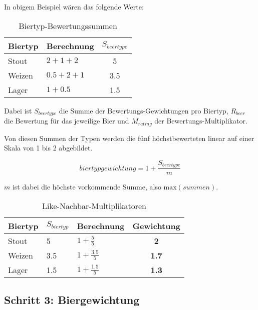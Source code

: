\documentclass[10pt,a4paper]{scrartcl}
\begin{document}
In obigem Beispiel wären das folgende Werte:

\begin{table}[h!]
	\begin{center}
		\begin{tabular}{llc}
			\toprule
			Biertyp & Berechnung & $S_{beertype}$ \\
			\midrule
			Stout  & $2 + 1 + 2$   & 5 \\
			Weizen & $0.5 + 2 + 1$ & 3.5 \\
			Lager  & $1 + 0.5$     & 1.5 \\
			\bottomrule
		\end{tabular}
	\end{center}
	\caption{Biertyp-Bewertungssummen}
	\label{table:biertyp-bewertungs-summen}
\end{table}

Dabei ist $S_{beertype}$ die Summe der Bewertungs-Gewichtungen pro Biertyp, $R_{beer}$ die Bewertung
für das jeweilige Bier und $M_{rating}$ der Bewertungs-Multiplikator.

Von diesen Summen der Typen werden die fünf höchstbewerteten linear auf einer Skala von 1 bis 2
abgebildet.

$$biertypgewichtung = 1 + \frac{S_{beertype}}{m}$$

$m$ ist dabei die höchste vorkommende Summe, also $\textrm{max}(summen)$.

\begin{table}[h!]
	\begin{center}
		\begin{tabular}{lllc}
			\toprule
			Biertyp & $S_{biertyp}$ & Berechnung & Gewichtung \\
			\midrule
			Stout  & 5   & $1 + \frac{5}{5}$   & \textbf{2} \\
			Weizen & 3.5 & $1 + \frac{3.5}{5}$ & \textbf{1.7}   \\
			Lager  & 1.5 & $1 + \frac{1.5}{5}$ & \textbf{1.3} \\
			\bottomrule
		\end{tabular}
	\end{center}
	\label{like-nachbar-multiplikatoren}
	\caption{Like-Nachbar-Multiplikatoren}
\end{table}



\subsection{Schritt 3: Biergewichtung}
\end{document}
